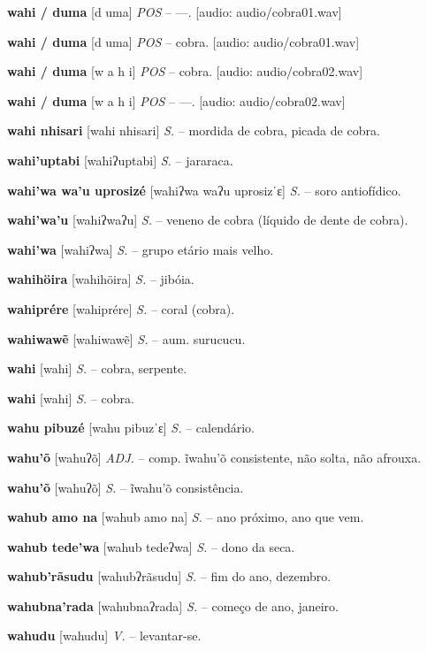 \textbf{wahi / duma} [d uma] \textit{POS} -- —. [audio: audio/cobra01.wav]{\faHeadphones}

\textbf{wahi / duma} [d uma] \textit{POS} -- cobra. [audio: audio/cobra01.wav]{\faHeadphones}

\textbf{wahi / duma} [w a h i] \textit{POS} -- cobra. [audio: audio/cobra02.wav]{\faHeadphones}

\textbf{wahi / duma} [w a h i] \textit{POS} -- —. [audio: audio/cobra02.wav]{\faHeadphones}

\textbf{wahi nhisari} [wahi nhisari] \textit{S.} -- mordida de cobra, picada de cobra.

\textbf{wahi'uptabi} [wahiʔuptabi] \textit{S.} -- jararaca.

\textbf{wahi'wa wa'u uprosizé} [wahiʔwa waʔu uprosizˈɛ] \textit{S.} -- soro antiofídico.

\textbf{wahi'wa'u} [wahiʔwaʔu] \textit{S.} -- veneno de cobra (líquido de dente de cobra).

\textbf{wahi'wa} [wahiʔwa] \textit{S.} -- grupo etário mais velho.

\textbf{wahihöira} [wahihöira] \textit{S.} -- jibóia.

\textbf{wahiprére} [wahiprére] \textit{S.} -- coral (cobra).

\textbf{wahiwawẽ} [wahiwawẽ] \textit{S.} -- aum. surucucu.

\textbf{wahi} [wahi] \textit{S.} -- cobra, serpente.

\textbf{wahi} [wahi] \textit{S.} -- cobra.

\textbf{wahu pibuzé} [wahu pibuzˈɛ] \textit{S.} -- calendário.

\textbf{wahu'õ} [wahuʔõ] \textit{ADJ.} -- comp. ĩwahu'õ consistente, não solta, não afrouxa.

\textbf{wahu'õ} [wahuʔõ] \textit{S.} -- ĩwahu'õ consistência.

\textbf{wahub amo na} [wahub amo na] \textit{S.} -- ano próximo, ano que vem.

\textbf{wahub tede'wa} [wahub tedeʔwa] \textit{S.} -- dono da seca.

\textbf{wahub'rãsudu} [wahubʔrãsudu] \textit{S.} -- fim do ano, dezembro.

\textbf{wahubna'rada} [wahubnaʔrada] \textit{S.} -- começo de ano, janeiro.

\textbf{wahudu} [wahudu] \textit{V.} -- levantar-se.

